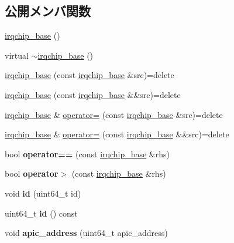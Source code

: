 \subsection*{公開メンバ関数}
\begin{DoxyCompactItemize}
\item 
\hyperlink{classirqchip__base_aaf201d6819b5452b5706bab0a54a4078}{irqchip\+\_\+base} ()
\item 
virtual \hyperlink{classirqchip__base_a7ec681fa10454a099ec56bd41f6e2f43}{$\sim$irqchip\+\_\+base} ()
\item 
\hyperlink{classirqchip__base_ab07d75a71ef13af774fd71b176c375e8}{irqchip\+\_\+base} (const \hyperlink{classirqchip__base}{irqchip\+\_\+base} \&src)=delete
\item 
\hyperlink{classirqchip__base_a903392a762dd05199663effcb6b88512}{irqchip\+\_\+base} (const \hyperlink{classirqchip__base}{irqchip\+\_\+base} \&\&src)=delete
\item 
\hyperlink{classirqchip__base}{irqchip\+\_\+base} \& \hyperlink{classirqchip__base_ae8f56c199cebbea51ec901f316e29670}{operator=} (const \hyperlink{classirqchip__base}{irqchip\+\_\+base} \&src)=delete
\item 
\hyperlink{classirqchip__base}{irqchip\+\_\+base} \& \hyperlink{classirqchip__base_aa16599b249ba6e54427abca666d66c00}{operator=} (const \hyperlink{classirqchip__base}{irqchip\+\_\+base} \&\&src)=delete
\item 
\hypertarget{classirqchip__base_a30b803034241c5e00db81157705a28e0}{}\label{classirqchip__base_a30b803034241c5e00db81157705a28e0} 
bool {\bfseries operator==} (const \hyperlink{classirqchip__base}{irqchip\+\_\+base} \&rhs)
\item 
\hypertarget{classirqchip__base_a07aeae532b54aef12b340ad13fa61efb}{}\label{classirqchip__base_a07aeae532b54aef12b340ad13fa61efb} 
bool {\bfseries operator$>$} (const \hyperlink{classirqchip__base}{irqchip\+\_\+base} \&rhs)
\item 
\hypertarget{classirqchip__base_add853bf0c0f98ccf5b927daf5cf7dfc9}{}\label{classirqchip__base_add853bf0c0f98ccf5b927daf5cf7dfc9} 
void {\bfseries id} (uint64\+\_\+t id)
\item 
\hypertarget{classirqchip__base_a4da814e0789dfb1d243f1600212ea55f}{}\label{classirqchip__base_a4da814e0789dfb1d243f1600212ea55f} 
uint64\+\_\+t {\bfseries id} () const
\item 
\hypertarget{classirqchip__base_a34f72690465fc4c6bd43acdb5d899cb9}{}\label{classirqchip__base_a34f72690465fc4c6bd43acdb5d899cb9} 
void {\bfseries apic\+\_\+address} (uint64\+\_\+t apic\+\_\+address)

\end{DoxyCompactItemize}
